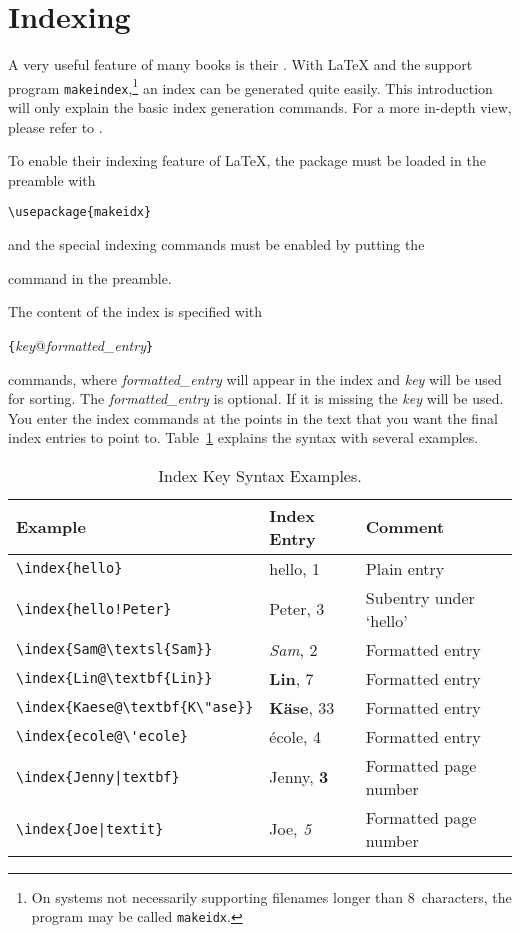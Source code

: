 \section{Indexing} \label{sec:indexing}
A very useful feature of many books is their . With \LaTeX{}
and the support program \texttt{makeindex},\footnote{On systems not
  necessarily supporting
  filenames longer than 8~characters, the program may be called
  \texttt{makeidx}.} an index can be generated quite easily.  This
introduction will only explain the basic index generation commands.
For a more in-depth view, please refer to \companion.   

To enable their indexing feature of \LaTeX{}, the  package
must be loaded in the preamble with
\begin{lscommand}
\verb|\usepackage{makeidx}|
\end{lscommand}
\noindent and the special indexing commands must be enabled by putting
the
\begin{lscommand}
\end{lscommand}
\noindent command in the preamble.

The content of the index is specified with
\begin{lscommand}
  \verb|{|\emph{key}@\emph{formatted\_entry}\verb|}|
\end{lscommand}
\noindent commands, where \emph{formatted\_entry} will appear in the index
and \emph{key} will be used for sorting.  The \emph{formatted\_entry} is
optional. If it is missing the \emph{key} will be used. You enter the index
commands at the points in the text that you want the final index entries to
point to.  Table~\ref{index} explains the syntax with several examples.

\begin{table}[!tp]
  \centering
\caption{Index Key Syntax Examples.}
\label{index}
\begin{tabular}{@{}lll@{}}
  \toprule
  Example &Index Entry &Comment\\\midrule
  \rule{0pt}{1.05em}\verb|\index{hello}| &hello, 1 &Plain entry\\
\verb|\index{hello!Peter}|   &\hspace*{2ex}Peter, 3 &Subentry under `hello'\\
\verb|\index{Sam@\textsl{Sam}}|     &\textsl{Sam}, 2& Formatted entry\\
\verb|\index{Lin@\textbf{Lin}}|     &\textbf{Lin}, 7& Formatted entry\\
\verb|\index{Kaese@\textbf{K\"ase}}|     &\textbf{K\"ase}, 33& Formatted entry\\
\verb.\index{ecole@\'ecole}.     &\'ecole, 4& Formatted entry\\
\verb.\index{Jenny|textbf}.     &Jenny, \textbf{3}& Formatted page number\\
\verb.\index{Joe|textit}.     &Joe, \textit{5}& Formatted page number\\
\bottomrule
\end{tabular}
\end{table}

